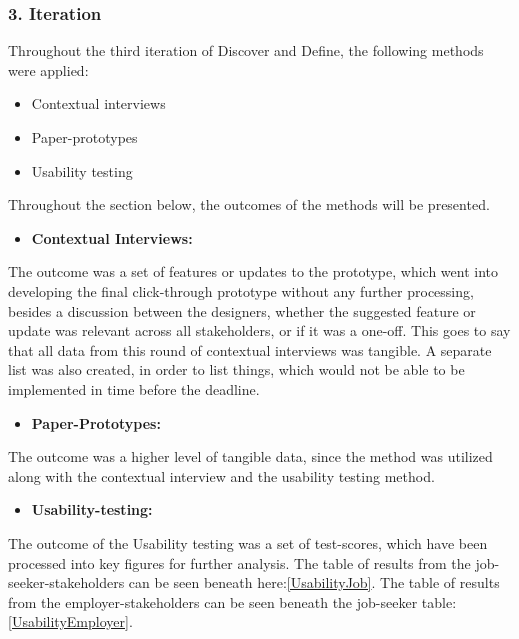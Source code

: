 \subsubsection{3. Iteration}

Throughout the third iteration of Discover and Define, the following methods were applied:
\begin{itemize}
    \item Contextual interviews
    \item Paper-prototypes
    \item Usability testing
\end{itemize}

Throughout the section below, the outcomes of the methods will be presented.

\begin{itemize}
    \item \bf{Contextual Interviews:}
\end{itemize}

The outcome was a set of features or updates to the prototype, which went into developing the final click-through prototype without any further processing, besides a discussion between the designers, whether the suggested feature or update was relevant across all stakeholders, or if it was a one-off. This goes to say that all data from this round of contextual interviews was tangible. A separate list was also created, in order to list things, which would not be able to be implemented in time before the deadline.

\begin{itemize}
    \item \bf{Paper-Prototypes:}
\end{itemize}

The outcome was a higher level of tangible data, since the method was utilized along with the contextual interview and the usability testing method. 

\begin{itemize}
    \item \bf{Usability-testing:}
\end{itemize}

The outcome of the Usability testing was a set of test-scores, which have been processed into key figures for further analysis. The table of results from the job-seeker-stakeholders can be seen beneath here:\ref{UsabilityJob}. The table of results from the employer-stakeholders can be seen beneath the job-seeker table:\ref{UsabilityEmployer}. 

